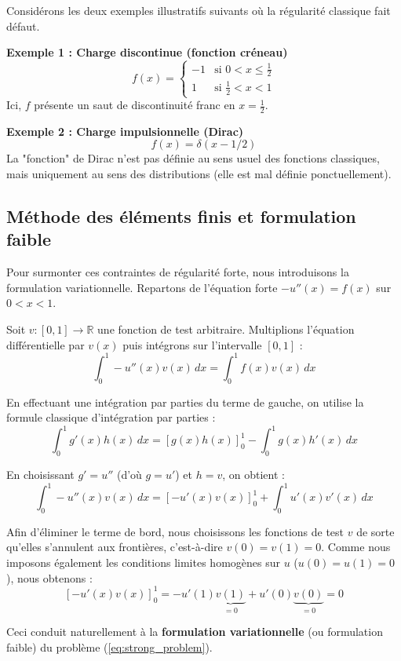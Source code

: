 Considérons les deux exemples illustratifs suivants où la régularité classique fait défaut.

\begin{exemple}
\textbf{Exemple 1 : Charge discontinue (fonction créneau)}
$$f(x) = \begin{cases} -1 & \text{si } 0 < x \le \frac{1}{2} \\ 1 & \text{si } \frac{1}{2} < x < 1 \end{cases}$$
Ici, $f$ présente un saut de discontinuité franc en $x = \frac{1}{2}$.

\textbf{Exemple 2 : Charge impulsionnelle (Dirac)}
$$f(x) = \delta(x - 1/2)$$
La "fonction" de Dirac n'est pas définie au sens usuel des fonctions classiques, mais uniquement au sens des distributions (elle est mal définie ponctuellement).
\end{exemple}

\subsection{Méthode des éléments finis et formulation faible}

Pour surmonter ces contraintes de régularité forte, nous introduisons la formulation variationnelle. Repartons de l'équation forte $-u''(x) = f(x)$ sur $0 < x < 1$.

Soit $v: [0, 1] \to \mathbb{R}$ une fonction de test arbitraire. Multiplions l'équation différentielle par $v(x)$ puis intégrons sur l'intervalle $[0, 1]$ :
$$\int_{0}^{1} -u''(x)v(x) \, dx = \int_{0}^{1} f(x)v(x) \, dx$$

En effectuant une intégration par parties du terme de gauche, on utilise la formule classique d'intégration par parties :
$$\int_{0}^{1} g'(x)h(x) \, dx = \left[ g(x)h(x) \right]_{0}^{1} - \int_{0}^{1} g(x)h'(x) \, dx$$

En choisissant $g' = u''$ (d'où $g = u'$) et $h = v$, on obtient :
$$\int_{0}^{1} -u''(x) v(x) \, dx = \left[ -u'(x)v(x) \right]_{0}^{1} + \int_{0}^{1} u'(x)v'(x) \, dx$$

Afin d'éliminer le terme de bord, nous choisissons les fonctions de test $v$ de sorte qu'elles s'annulent aux frontières, c'est-à-dire $v(0) = v(1) = 0$. Comme nous imposons également les conditions limites homogènes sur $u$ ($u(0) = u(1) = 0$), nous obtenons :
$$\left[ -u'(x)v(x) \right]_{0}^{1} = -u'(1)\underbrace{v(1)}_{=0} + u'(0)\underbrace{v(0)}_{=0} = 0$$

Ceci conduit naturellement à la \textbf{formulation variationnelle} (ou formulation faible) du problème (\ref{eq:strong_problem}).

